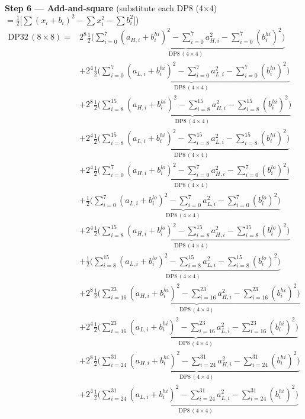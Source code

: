 \documentclass[fleqn]{article}
\newcommand{\DPop}[3]{\mathrm{DP#1}\,(#2\!\times\!#3)}
\begin{document}
\textbf{Step 6 --- Add-and-square}\quad
{\small(substitute each DP8 (4$\times$4) $= \tfrac{1}{2}\big[\sum(x_i{+}b_i)^2 - \sum x_i^2 - \sum b_i^2\big]$)}
\begin{align*}
\DPop{32}{8}{8} = {}
  & 2^{8}\underbrace{\tfrac{1}{2}\Big(\sum_{i=0}^{7}(a_{H,i}{+}b_i^{hi})^2 - \sum_{i=0}^{7}a_{H,i}^2 - \sum_{i=0}^{7}(b_i^{hi})^2\Big)}_{\DPop{8}{4}{4}} \\[0.5em]
  & + 2^{4}\underbrace{\tfrac{1}{2}\Big(\sum_{i=0}^{7}(a_{L,i}{+}b_i^{hi})^2 - \sum_{i=0}^{7}a_{L,i}^2 - \sum_{i=0}^{7}(b_i^{hi})^2\Big)}_{\DPop{8}{4}{4}} \\[0.5em]
  & + 2^{8}\underbrace{\tfrac{1}{2}\Big(\sum_{i=8}^{15}(a_{H,i}{+}b_i^{hi})^2 - \sum_{i=8}^{15}a_{H,i}^2 - \sum_{i=8}^{15}(b_i^{hi})^2\Big)}_{\DPop{8}{4}{4}} \\[0.5em]
  & + 2^{4}\underbrace{\tfrac{1}{2}\Big(\sum_{i=8}^{15}(a_{L,i}{+}b_i^{hi})^2 - \sum_{i=8}^{15}a_{L,i}^2 - \sum_{i=8}^{15}(b_i^{hi})^2\Big)}_{\DPop{8}{4}{4}} \\[0.5em]
  & + 2^{4}\underbrace{\tfrac{1}{2}\Big(\sum_{i=0}^{7}(a_{H,i}{+}b_i^{lo})^2 - \sum_{i=0}^{7}a_{H,i}^2 - \sum_{i=0}^{7}(b_i^{lo})^2\Big)}_{\DPop{8}{4}{4}} \\[0.5em]
  & + \underbrace{\tfrac{1}{2}\Big(\sum_{i=0}^{7}(a_{L,i}{+}b_i^{lo})^2 - \sum_{i=0}^{7}a_{L,i}^2 - \sum_{i=0}^{7}(b_i^{lo})^2\Big)}_{\DPop{8}{4}{4}} \\[0.5em]
  & + 2^{4}\underbrace{\tfrac{1}{2}\Big(\sum_{i=8}^{15}(a_{H,i}{+}b_i^{lo})^2 - \sum_{i=8}^{15}a_{H,i}^2 - \sum_{i=8}^{15}(b_i^{lo})^2\Big)}_{\DPop{8}{4}{4}} \\[0.5em]
  & + \underbrace{\tfrac{1}{2}\Big(\sum_{i=8}^{15}(a_{L,i}{+}b_i^{lo})^2 - \sum_{i=8}^{15}a_{L,i}^2 - \sum_{i=8}^{15}(b_i^{lo})^2\Big)}_{\DPop{8}{4}{4}} \\[0.5em]
  & + 2^{8}\underbrace{\tfrac{1}{2}\Big(\sum_{i=16}^{23}(a_{H,i}{+}b_i^{hi})^2 - \sum_{i=16}^{23}a_{H,i}^2 - \sum_{i=16}^{23}(b_i^{hi})^2\Big)}_{\DPop{8}{4}{4}} \\[0.5em]
  & + 2^{4}\underbrace{\tfrac{1}{2}\Big(\sum_{i=16}^{23}(a_{L,i}{+}b_i^{hi})^2 - \sum_{i=16}^{23}a_{L,i}^2 - \sum_{i=16}^{23}(b_i^{hi})^2\Big)}_{\DPop{8}{4}{4}} \\[0.5em]
  & + 2^{8}\underbrace{\tfrac{1}{2}\Big(\sum_{i=24}^{31}(a_{H,i}{+}b_i^{hi})^2 - \sum_{i=24}^{31}a_{H,i}^2 - \sum_{i=24}^{31}(b_i^{hi})^2\Big)}_{\DPop{8}{4}{4}} \\[0.5em]
  & + 2^{4}\underbrace{\tfrac{1}{2}\Big(\sum_{i=24}^{31}(a_{L,i}{+}b_i^{hi})^2 - \sum_{i=24}^{31}a_{L,i}^2 - \sum_{i=24}^{31}(b_i^{hi})^2\Big)}_{\DPop{8}{4}{4}} \\[0.5em]

\end{align*}
\end{document}
